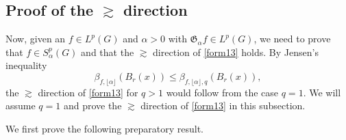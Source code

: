\documentclass[11pt,reqno]{amsart}
\newcommand{\1}{\mathbf 1}
\begin{document}
\subsection{Proof of the $\gtrsim$ direction}\label{subsec:geQ=1}
Now, given an $f\in L^p\left(G\right)$ and $\alpha>0$ with $\mathfrak{G}_\alpha f\in L^p\left(G\right)$, we need to prove that $f\in S^p_\alpha\left(G\right)$ and that the $\gtrsim$ direction of \eqref{form13} holds. By Jensen's inequality 
\[
\beta_{f,\lfloor \alpha \rfloor}\left(B_r\left(x\right)\right)\le \beta_{f,\lfloor \alpha \rfloor,q}\left(B_r\left(x\right)\right),
\]
the $\gtrsim$ direction of \eqref{form13} for $q>1$ would follow from the case $q=1$. We will assume $q=1$ and prove the $\gtrsim$ direction of \eqref{form13} in this subsection.


We first prove the following preparatory result.
\end{document}
